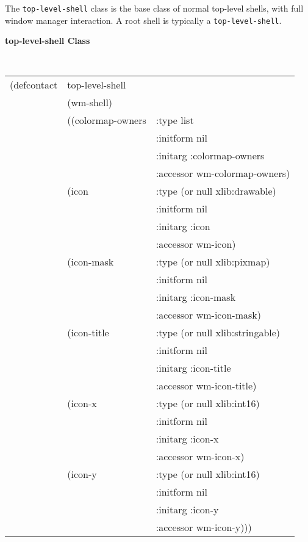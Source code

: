 The {\tt top-level-shell} class is the base class of normal top-level
shells, with full window manager interaction.  A root shell is typically
a {\tt top-level-shell}.

{\samepage 
{\large {\bf top-level-shell \hfill Class}} 
\begin{flushright} \parbox[t]{6.125in}{
\tt
\begin{tabular}{lll}
\raggedright
(defcontact & top-level-shell \\
&  (wm-shell) \\
&  ((colormap-owners   & :type     list \\
&		       & :initform nil  \\
&		       & :initarg  :colormap-owners \\
&		       & :accessor wm-colormap-owners)    \\
&   (icon              & :type     (or null xlib:drawable) \\
&		       & :initform nil  \\
&		       & :initarg  :icon \\
&		       & :accessor wm-icon)    \\
&   (icon-mask         & :type     (or null xlib:pixmap) \\
&		       & :initform nil  \\
&		       & :initarg  :icon-mask \\
&		       & :accessor wm-icon-mask)    \\
&   (icon-title        & :type     (or null xlib:stringable) \\
&		       & :initform nil  \\
&		       & :initarg  :icon-title \\
&		       & :accessor wm-icon-title)    \\
&   (icon-x            & :type     (or null xlib:int16) \\
&		       & :initform nil  \\
&		       & :initarg  :icon-x \\
&		       & :accessor wm-icon-x)    \\
&   (icon-y            & :type     (or null xlib:int16) \\
&		       & :initform nil  \\
&		       & :initarg  :icon-y \\
&		       & :accessor wm-icon-y)))
\end{tabular}
\rm

}\end{flushright}}

